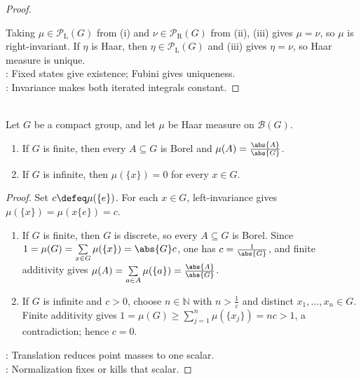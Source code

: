 \begin{theorem}
\begin{proof}
\begin{enumerate}[label=(\roman*)]
\end{enumerate}
Taking $\mu\in\mathcal{P}_{\mathrm{L}}(G)$ from (i) and $\nu\in\mathcal{P}_{\mathrm{R}}(G)$ from (ii), (iii) gives $\mu=\nu$, so $\mu$ is right-invariant. If $\eta$ is Haar, then $\eta\in\mathcal{P}_{\mathrm{L}}(G)$ and (iii) gives $\eta=\nu$, so Haar measure is unique.\\
: Fixed states give existence; Fubini gives uniqueness.\\
: Invariance makes both iterated integrals constant.
\end{proof}
\end{theorem}

\begin{proposition} \label{prop:haar-point-masses-on-compact-groups} \\
Let $G$ be a compact group, and let $\mu$ be Haar measure on $\mathcal{B}(G)$.
\begin{enumerate}[label=(\roman*)]
\setlength{\itemsep}{0pt}
\item If $G$ is finite, then every $A\subseteq G$ is Borel and $\mu(A)=\frac{\abs{A}}{\abs{G}}$.
\item If $G$ is infinite, then $\mu(\{x\})=0$ for every $x\in G$.
\end{enumerate}
\begin{proof}
Set $c\defeq\mu(\{e\})$. For each $x\in G$, left-invariance gives $\mu(\{x\})=\mu(x\{e\})=c$.
\begin{enumerate}[label=(\roman*)]
\setlength{\itemsep}{0pt}
\item If $G$ is finite, then $G$ is discrete, so every $A\subseteq G$ is Borel. Since $1=\mu(G)=\sum\limits_{x\in G}\mu(\{x\})=\abs{G}c$, one has $c=\frac{1}{\abs{G}}$, and finite additivity gives $\mu(A)=\sum\limits_{a\in A}\mu(\{a\})=\frac{\abs{A}}{\abs{G}}$.
\item If $G$ is infinite and $c>0$, choose $n\in\mathbb{N}$ with $n>\frac{1}{c}$ and distinct $x_1,\ldots,x_n\in G$.\\
Finite additivity gives $1=\mu(G)\geq\sum\limits_{j=1}^{n}\mu(\{x_j\})=nc>1$, a contradiction; hence $c=0$.
\end{enumerate}
: Translation reduces point masses to one scalar.\\
: Normalization fixes or kills that scalar.
\end{proof}
\end{proposition}

